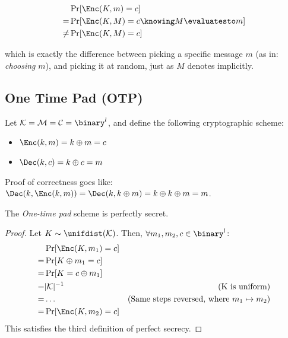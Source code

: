 \begin{align*}
    & \Pr[\Enc(K, m) = c] \\
    =& \Pr[\Enc(K, M) = c \knowing M \evaluatesto m] \\
    \neq& \Pr[\Enc(K, M) = c]
\end{align*}

which is exactly the difference between picking a specific message $m$ (as in: \emph{choosing} $m$), and picking it at random, just as $M$ denotes implicitly.

\subsection{One Time Pad (OTP)}

Let $\K = \M = \C = \binary^l$, and define the following cryptographic scheme:
\begin{itemize}
    \item $\Enc(k, m) = k \xor m = c$
    \item $\Dec(k, c) = k \xor c = m$
\end{itemize}

Proof of correctness goes like: $\Dec(k, \Enc(k, m)) = \Dec(k, k \xor m) = k \xor k \xor m = m$.

\begin{theorem}
    The \emph{One-time pad} scheme is perfectly secret.
\end{theorem}
\begin{proof}
    Let $K \sim \unifdist(\K)$. Then, $\forall m_1, m_2, c \in \binary^l$:
    \begin{align*}
        & \Pr[\Enc(K, m_1) = c]     & \\
        =& \Pr[K \xor m_1 = c]      & \\
        =& \Pr[K = c \xor m_1]      & \\
        =& |\K|^{-1}                & \text{(K is uniform)} \\
        =& \dots                    & \text{(Same steps reversed, where $m_1 \mapsto m_2$)} \\
        =& \Pr[\Enc(K, m_2) = c]    & \\  
    \end{align*}
    This satisfies the third definition of perfect secrecy.
\end{proof}


